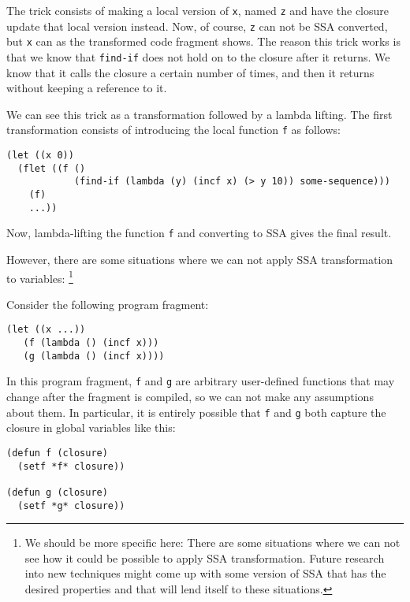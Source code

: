 The trick consists of making a local version of \texttt{x}, named
\texttt{z} and have the closure update that local version instead.
Now, of course, \texttt{z} can not be SSA converted, but \texttt{x}
can as the transformed code fragment shows.  The reason this trick
works is that we know that \texttt{find-if} does not hold on to the
closure after it returns.  We know that it calls the closure a certain
number of times, and then it returns without keeping a reference to
it.%

We can see this trick as a transformation followed by a lambda
lifting.  The first transformation consists of introducing the local
function \texttt{f} as follows:

\begin{verbatim}
(let ((x 0))
  (flet ((f ()
            (find-if (lambda (y) (incf x) (> y 10)) some-sequence)))
    (f)
    ...)) 
\end{verbatim}

Now, lambda-lifting the function \texttt{f} and converting to SSA
gives the final result. 

However, there are some situations where we can not apply SSA
transformation to variables:%
\footnote{We should be more specific here: There are some situations
  where we can not see how it could be possible to apply SSA
  transformation.  Future research into new techniques might come up
  with some version of SSA that has the desired properties and that
  will lend itself to these situations.}

Consider the following program fragment:

\begin{verbatim}
(let ((x ...))
   (f (lambda () (incf x)))
   (g (lambda () (incf x))))
\end{verbatim}

In this program fragment, \texttt{f} and \texttt{g} are arbitrary
user-defined functions that may change after the fragment is compiled,
so we can not make any assumptions about them.  In particular, it is
entirely possible that \texttt{f} and \texttt{g} both capture the
closure in global variables like this:

\begin{verbatim}
(defun f (closure)
  (setf *f* closure))

(defun g (closure)
  (setf *g* closure))
\end{verbatim}

